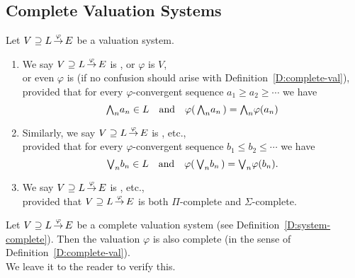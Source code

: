 \documentclass[main.tex]{subfiles}
\begin{document}
\subsection{Complete Valuation Systems}
\label{SS:complete-valuation-systems}
%
%
\begin{dfn}
\label{D:system-complete}
Let $V \supseteq L\,\smash{\stackrel{\varphi}{\rightarrow}}\,E$ be a valuation system.
\begin{enumerate}
\item 
We say $V \supseteq L\,\smash{\stackrel{\varphi}{\rightarrow}}\,E$
is ,
or  $\varphi$ is  $V$,\\
or even $\varphi$ is   (if no confusion should 
arise with
Definition~\ref{D:complete-val}),\\
provided that for every $\varphi$-convergent sequence
$a_1\geq a_2 \geq \dotsb$ we have
\begin{equation*}
   \textstyle{\bigwedge}_n a_n \in L\quad 
  \text{and}\quad
  \varphi(\,\textstyle{\bigwedge}_n a_n\,) = \textstyle{\bigwedge}_n \varphi(a_n)
\end{equation*}

\item
Similarly,
we say $V \supseteq L\,\smash{\stackrel{\varphi}{\rightarrow}}\,E$
is , etc.,\\
provided that for every $\varphi$-convergent sequence
$b_1\leq b_2 \leq \dotsb$ we have
\begin{equation*}
   \textstyle{\bigvee}_n b_n \in L\quad 
  \text{and}\quad
  \varphi(\,\textstyle{\bigvee}_n b_n\,) = \textstyle{\bigvee}_n \varphi(b_n).
\end{equation*}

\item
We say $V \supseteq L\,\smash{\stackrel{\varphi}{\rightarrow}}\,E$
is , etc.,\\
provided that 
$V \supseteq L\,\smash{\stackrel{\varphi}{\rightarrow}}\,E$
is both $\Pi$-complete and $\Sigma$-complete.
\end{enumerate}
\end{dfn}
%
%
\begin{rem}
Let $V \supseteq L\,\smash{\stackrel{\varphi}{\rightarrow}}\,E$ be a complete valuation
system
(see Definition~\ref{D:system-complete}).
Then the valuation $\varphi$
is also complete (in the sense
of Definition~\ref{D:complete-val}).\\
We leave it to the reader to verify this.
\end{rem}
%
%
\end{document}
